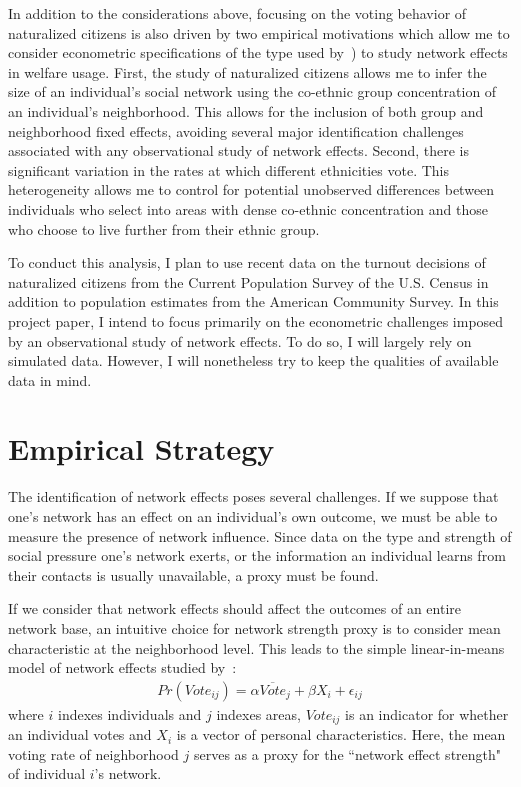 \documentclass[11pt, oneside]{article}   	%
\newcommand{\eqs}[1]{\begin{align*}#1\end{align*}}
\begin{document}
In addition to the considerations above, focusing on the voting behavior of naturalized citizens is also driven by two empirical motivations which allow me to consider econometric specifications of the type used by~\cite{Bertrand2000}) to study network effects in welfare usage. First, the study of naturalized citizens allows me to infer the size of an individual's social network using the co-ethnic group concentration of an individual's neighborhood. This allows for the inclusion of both group and neighborhood fixed effects, avoiding several major identification challenges associated with any observational study of network effects. Second, there is significant variation in the rates at which different ethnicities vote. This heterogeneity allows me to control for potential unobserved differences between individuals who select into areas with dense co-ethnic concentration and those who choose to live further from their ethnic group. 

To conduct this analysis, I plan to use recent data on the turnout decisions of naturalized citizens from the Current Population Survey of the U.S. Census in addition to population estimates from the American Community Survey. In this project paper, I intend to focus primarily on the econometric challenges imposed by an observational study of network effects. To do so, I will largely rely on simulated data. However, I will nonetheless try to keep the qualities of available data in mind.

\section{Empirical Strategy}

The identification of network effects poses several challenges. If we suppose that one's network has an effect on an individual's own outcome, we must be able to measure the presence of network influence. Since data on the type and strength of social pressure one's network exerts, or the information an individual learns from their contacts is usually unavailable, a proxy must be found. 

If we consider that network effects should affect the outcomes of an entire network base, an intuitive choice for network strength proxy is to consider mean characteristic at the neighborhood level. This leads to the simple linear-in-means model of network effects studied by~\cite{Manski1993}:
\eqs{
	Pr(Vote_{ij}) = \alpha \overline{Vote}_j + \beta X_i + \epsilon_{ij}
}
where $i$ indexes individuals and $j$ indexes areas, $Vote_{ij}$ is an indicator for whether an individual votes and $X_i$ is a vector of personal characteristics. Here, the mean voting rate of neighborhood $j$ serves as a proxy for the ``network effect strength" of individual $i$'s network. 
\end{document}
